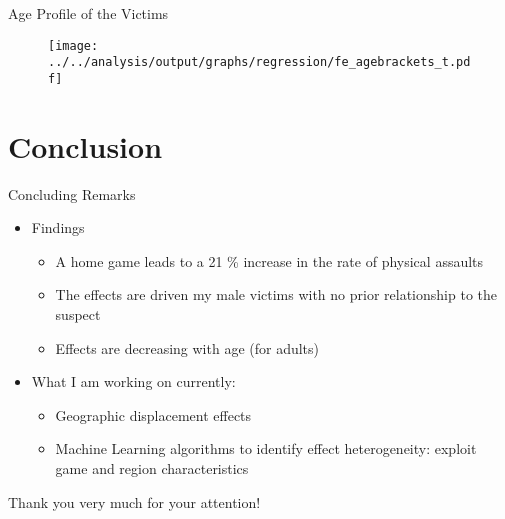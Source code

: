 \documentclass[usenames,dvipsnames]{beamer} %
\begin{document}
	\begin{frame}{Age Profile of the Victims}\label{link_regression_age_profile}
		\begin{figure}[H]\centering
			\texttt{[image: ../../analysis/output/graphs/regression/fe\_agebrackets\_t.pdf]}
		\end{figure}
		\hyperlink{link_regression_age_profile_per_gender}{}
	\end{frame}




\section{Conclusion}

\begin{frame}{Concluding Remarks}
	\begin{itemize}
		\item Findings
		\begin{itemize}
			\item A home game leads to a 21 \% increase in the rate of physical assaults
			\item The effects are driven my male victims with no prior relationship to the suspect
			\item Effects are decreasing with age (for adults)
		\end{itemize}				
		\item What I am working on currently: 
		\begin{itemize}
			\item Geographic displacement effects
			\item Machine Learning algorithms to identify effect heterogeneity: exploit game and region characteristics
		\end{itemize}
	\end{itemize}
\end{frame}


\begin{frame}
	\begin{center}
		Thank you very much for your attention!
	\end{center}
\end{frame}
\end{document}
